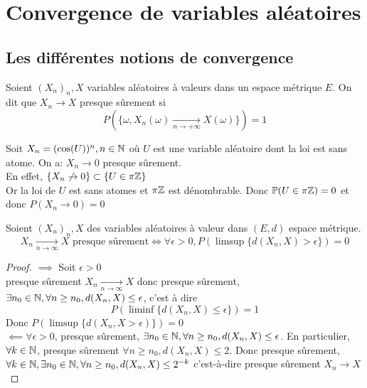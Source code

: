 \documentclass[]{report}
\begin{document}
    \chapter{Convergence de variables aléatoires}

    \section{Les différentes notions de convergence}

    \begin{df}{}{}
        Soient $(X_n)_n,X$ variables aléatoires à valeurs dans un espace métrique $E$. On dit que $X_n\to X$ presque sûrement si
        \[P(\{\omega,X_n(\omega)\underset{n\to+\infty}{\longrightarrow} X(\omega)\})=1\]
    \end{df}

    \begin{ex}{}{}
        Soit $X_n=(\cos(U))^n,n\in \mathbb{N}$ où $U$ est une variable aléatoire dont la loi est sans atome. On a: $X_n\to 0$ presque sûrement.\\
        En effet, $\{X_n\not\to 0\}\subset \{U\in \pi \mathbb{Z}\}$\\
        Or la loi de $U$ est sans atomes et $\pi \mathbb{Z}$ est dénombrable. Donc $\mathbb{P}(U\in \pi\mathbb{Z})=0$ et donc $P(X_n\to 0)=0$
    \end{ex}

    \begin{lm}{}{}
        Soient $(X_n)_n,X$ des variables aléatoires à valeur dans $(E,d)$ espace métrique.
        \[X_n\underset{n\to\infty}{\longrightarrow}X\text{ presque sûrement}\iff \forall \epsilon>0,P(\limsup\{d(X_n,X)>\epsilon\})=0\]
    \end{lm}

    \begin{proof}
        $\implies$ Soit $\epsilon>0$\\
        presque sûrement $X_n\underset{n\to \infty}{\longrightarrow}X$ donc presque sûrement, $\exists n_0\in \mathbb{N},\forall n\ge n_0, d(X_n,X)\le \epsilon$, c'est à dire
        \[P(\liminf \{d(X_n,X)\le \epsilon\})=1\]
        Donc $P(\limsup\{d(X_n,X>\epsilon)\})=0$\\
        $\impliedby \forall \epsilon >0$, presque sûrement, $\exists n_0\in \mathbb{N},\forall n\ge n_0,d(X_n,X)\le \epsilon$. En particulier, $\forall k\in \mathbb{N}$, presque sûrement $\forall n\ge n_0,d(X_n,X)\le 2$. Donc presque sûrement, $\forall k\in \mathbb{N},\exists n_0\in \mathbb{N},\forall n\ge n_0,d(X_n,X)\le 2^{-k}$ c'est-à-dire presque sûrement $X_n\longrightarrow X$
    \end{proof}
\end{document}
